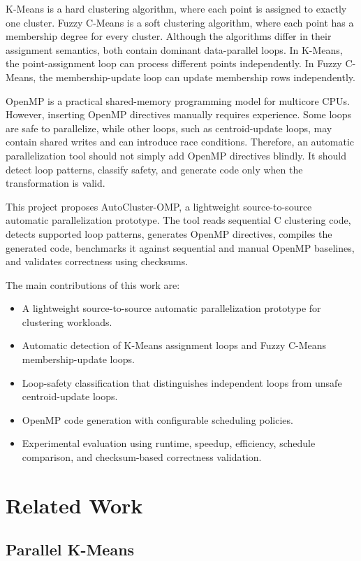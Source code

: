 \documentclass[conference,10pt]{IEEEtran}
\begin{document}
K-Means is a hard clustering algorithm, where each point is assigned to exactly one cluster. Fuzzy C-Means is a soft clustering algorithm, where each point has a membership degree for every cluster. Although the algorithms differ in their assignment semantics, both contain dominant data-parallel loops. In K-Means, the point-assignment loop can process different points independently. In Fuzzy C-Means, the membership-update loop can update membership rows independently.

OpenMP is a practical shared-memory programming model for multicore CPUs. However, inserting OpenMP directives manually requires experience. Some loops are safe to parallelize, while other loops, such as centroid-update loops, may contain shared writes and can introduce race conditions. Therefore, an automatic parallelization tool should not simply add OpenMP directives blindly. It should detect loop patterns, classify safety, and generate code only when the transformation is valid.

This project proposes AutoCluster-OMP, a lightweight source-to-source automatic parallelization prototype. The tool reads sequential C clustering code, detects supported loop patterns, generates OpenMP directives, compiles the generated code, benchmarks it against sequential and manual OpenMP baselines, and validates correctness using checksums.

The main contributions of this work are:
\begin{itemize}
    \item A lightweight source-to-source automatic parallelization prototype for clustering workloads.
    \item Automatic detection of K-Means assignment loops and Fuzzy C-Means membership-update loops.
    \item Loop-safety classification that distinguishes independent loops from unsafe centroid-update loops.
    \item OpenMP code generation with configurable scheduling policies.
    \item Experimental evaluation using runtime, speedup, efficiency, schedule comparison, and checksum-based correctness validation.
\end{itemize}

\section{Related Work}

\subsection{Parallel K-Means}
\end{document}
